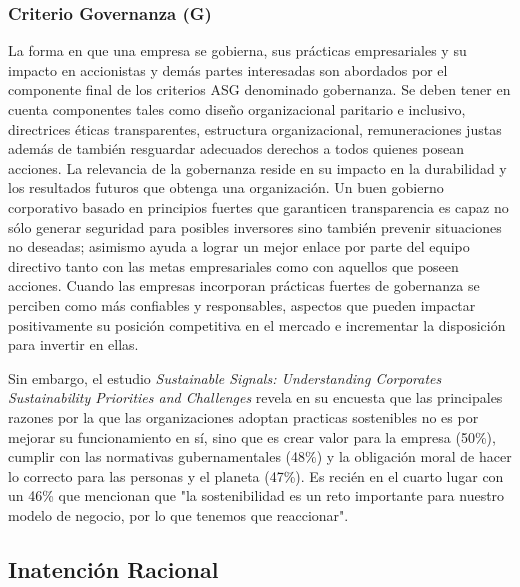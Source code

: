 \subsubsection{Criterio Governanza (G)}
La forma en que una empresa se gobierna, sus prácticas empresariales y su impacto en accionistas y demás partes interesadas son abordados por el componente final de los criterios ASG denominado gobernanza. Se deben tener en cuenta componentes tales como diseño organizacional paritario e inclusivo, directrices éticas transparentes, estructura organizacional, remuneraciones justas además  de también resguardar adecuados derechos a todos quienes posean acciones. La relevancia de la gobernanza reside en su impacto en la durabilidad y los resultados futuros que obtenga una organización. Un buen gobierno corporativo basado en principios fuertes que garanticen transparencia es capaz no sólo generar seguridad para posibles inversores sino también prevenir situaciones no deseadas; asimismo ayuda a lograr un mejor enlace por parte del equipo directivo tanto con las metas empresariales como con aquellos que poseen acciones. Cuando las empresas incorporan prácticas fuertes de gobernanza se perciben como más confiables y responsables, aspectos que pueden impactar positivamente su posición competitiva en el mercado e incrementar la disposición para invertir en ellas.

Sin embargo, el estudio \textit{Sustainable Signals: Understanding Corporates Sustainability Priorities and Challenges} \cite{morgan_stanley_sustainable_2024} revela en su encuesta que las principales razones por la que las organizaciones adoptan practicas sostenibles no es por mejorar su funcionamiento en sí, sino que es crear valor para la empresa (50\%), cumplir con las normativas gubernamentales (48\%) y la obligación moral de hacer lo correcto para las personas y el planeta (47\%). Es recién en el cuarto lugar con un 46\% que mencionan que "la sostenibilidad es un reto importante para nuestro modelo de negocio, por lo que tenemos que reaccionar".


\subsection{Inatención Racional}

